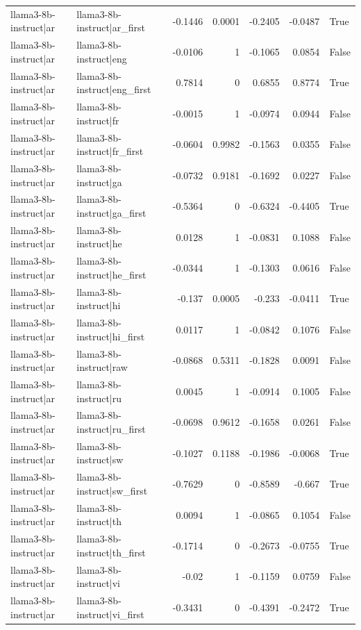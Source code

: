 \begin{table}
\begin{tabular}{l l r r r r l}
llama3-8b-instruct|ar & llama3-8b-instruct|ar_first & -0.1446 & 0.0001 & -0.2405 & -0.0487 & True \\
llama3-8b-instruct|ar & llama3-8b-instruct|eng & -0.0106 & 1 & -0.1065 & 0.0854 & False \\
llama3-8b-instruct|ar & llama3-8b-instruct|eng_first & 0.7814 & 0 & 0.6855 & 0.8774 & True \\
llama3-8b-instruct|ar & llama3-8b-instruct|fr & -0.0015 & 1 & -0.0974 & 0.0944 & False \\
llama3-8b-instruct|ar & llama3-8b-instruct|fr_first & -0.0604 & 0.9982 & -0.1563 & 0.0355 & False \\
llama3-8b-instruct|ar & llama3-8b-instruct|ga & -0.0732 & 0.9181 & -0.1692 & 0.0227 & False \\
llama3-8b-instruct|ar & llama3-8b-instruct|ga_first & -0.5364 & 0 & -0.6324 & -0.4405 & True \\
llama3-8b-instruct|ar & llama3-8b-instruct|he & 0.0128 & 1 & -0.0831 & 0.1088 & False \\
llama3-8b-instruct|ar & llama3-8b-instruct|he_first & -0.0344 & 1 & -0.1303 & 0.0616 & False \\
llama3-8b-instruct|ar & llama3-8b-instruct|hi & -0.137 & 0.0005 & -0.233 & -0.0411 & True \\
llama3-8b-instruct|ar & llama3-8b-instruct|hi_first & 0.0117 & 1 & -0.0842 & 0.1076 & False \\
llama3-8b-instruct|ar & llama3-8b-instruct|raw & -0.0868 & 0.5311 & -0.1828 & 0.0091 & False \\
llama3-8b-instruct|ar & llama3-8b-instruct|ru & 0.0045 & 1 & -0.0914 & 0.1005 & False \\
llama3-8b-instruct|ar & llama3-8b-instruct|ru_first & -0.0698 & 0.9612 & -0.1658 & 0.0261 & False \\
llama3-8b-instruct|ar & llama3-8b-instruct|sw & -0.1027 & 0.1188 & -0.1986 & -0.0068 & True \\
llama3-8b-instruct|ar & llama3-8b-instruct|sw_first & -0.7629 & 0 & -0.8589 & -0.667 & True \\
llama3-8b-instruct|ar & llama3-8b-instruct|th & 0.0094 & 1 & -0.0865 & 0.1054 & False \\
llama3-8b-instruct|ar & llama3-8b-instruct|th_first & -0.1714 & 0 & -0.2673 & -0.0755 & True \\
llama3-8b-instruct|ar & llama3-8b-instruct|vi & -0.02 & 1 & -0.1159 & 0.0759 & False \\
llama3-8b-instruct|ar & llama3-8b-instruct|vi_first & -0.3431 & 0 & -0.4391 & -0.2472 & True \\

\end{tabular}
\end{table}
